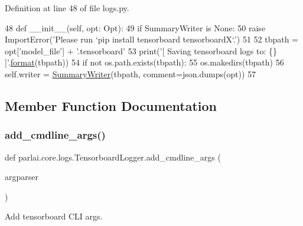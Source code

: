 Definition at line 48 of file logs.\+py.


\begin{DoxyCode}
48     \textcolor{keyword}{def }\_\_init\_\_(self, opt: Opt):
49         \textcolor{keywordflow}{if} SummaryWriter \textcolor{keywordflow}{is} \textcolor{keywordtype}{None}:
50             \textcolor{keywordflow}{raise} ImportError(\textcolor{stringliteral}{'Please run `pip install tensorboard tensorboardX`.'})
51 
52         tbpath = opt[\textcolor{stringliteral}{'model\_file'}] + \textcolor{stringliteral}{'.tensorboard'}
53         print(\textcolor{stringliteral}{'[ Saving tensorboard logs to: \{\} ]'}.\hyperlink{namespaceparlai_1_1chat__service_1_1services_1_1messenger_1_1shared__utils_a32e2e2022b824fbaf80c747160b52a76}{format}(tbpath))
54         \textcolor{keywordflow}{if} \textcolor{keywordflow}{not} os.path.exists(tbpath):
55             os.makedirs(tbpath)
56         self.writer = \hyperlink{namespaceparlai_1_1core_1_1logs_a214c91224d7834e7962d77d49f17bbc4}{SummaryWriter}(tbpath, comment=json.dumps(opt))
57 
\end{DoxyCode}


\subsection{Member Function Documentation}
\mbox{\label{classparlai_1_1core_1_1logs_1_1TensorboardLogger_a22488a4b41a75dce0a1c467418882e83}} 
\subsubsection{\texorpdfstring{add\+\_\+cmdline\+\_\+args()}{add\_cmdline\_args()}}
{\footnotesize\ttfamily def parlai.\+core.\+logs.\+Tensorboard\+Logger.\+add\+\_\+cmdline\+\_\+args (\begin{DoxyParamCaption}\item[{}]{argparser }\end{DoxyParamCaption})\hspace{0.3cm}{\ttfamily [static]}}

\begin{DoxyVerb}Add tensorboard CLI args.
\end{DoxyVerb}
 

